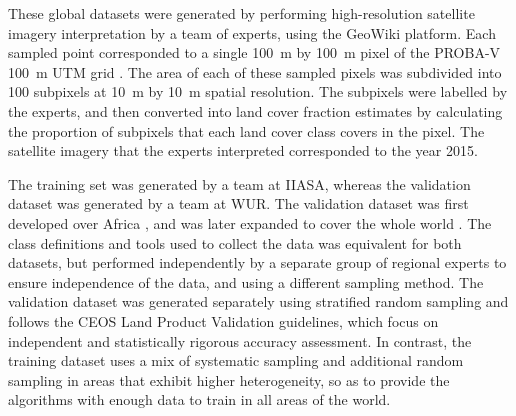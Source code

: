 \documentclass[review,authoryear,3p]{elsarticle}
\begin{document}
These global datasets were generated by performing high-resolution satellite imagery interpretation by a team of experts, using the GeoWiki platform.
Each sampled point corresponded to a single 100~m by 100~m pixel of the PROBA-V 100~m UTM grid \citep{buchhorn_copernicus_2020}.
The area of each of these sampled pixels was subdivided into 100 subpixels at 10~m by 10~m spatial resolution.
The subpixels were labelled by the experts, and then converted into land cover fraction estimates by calculating the proportion of subpixels that each land cover class covers in the pixel.
The satellite imagery that the experts interpreted corresponded to the year 2015.


The training set was generated by a team at \ac{IIASA}, whereas the validation dataset was generated by a team at \gls{WUR}.
The validation dataset was first developed over Africa \citep{tsendbazar_developing_2018}, and was later expanded to cover the whole world \citep{buchhorn_copernicus_2020}.
The class definitions and tools used to collect the data was equivalent for both datasets, but performed independently by a separate group of regional experts to ensure independence of the data, and using a different sampling method.
The validation dataset was generated separately using stratified random sampling and follows the CEOS Land Product Validation guidelines, which focus on independent and statistically rigorous accuracy assessment.
In contrast, the training dataset uses a mix of systematic sampling and additional random sampling in areas that exhibit higher heterogeneity, so as to provide the algorithms with enough data to train in all areas of the world.
\end{document}

